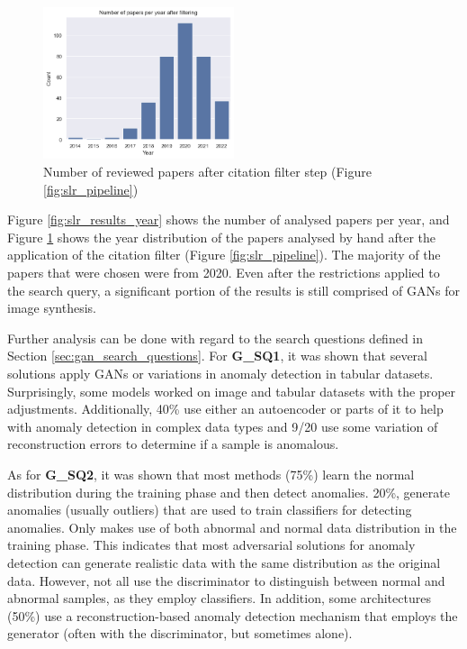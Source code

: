 \begin{figure}[]
\centering
\includegraphics[width=0.5\textwidth]{figures/slr_results_filtering.png}
\caption{Number of reviewed papers after citation filter step (Figure \ref{fig:slr_pipeline})}
\label{fig:slr_after_filter}
\end{figure}

Figure \ref{fig:slr_results_year} shows the number of analysed papers per year, and Figure \ref{fig:slr_after_filter} shows the year distribution of the papers analysed by hand after the application of the citation filter (Figure \ref{fig:slr_pipeline}). The majority of the papers that were chosen were from 2020. Even after the restrictions applied to the search query, a significant portion of the results is still comprised of GANs for image synthesis.

Further analysis can be done with regard to the search questions defined in Section \ref{sec:gan_search_questions}. For \textbf{G\_SQ1}, it was shown that several solutions apply GANs or variations in anomaly detection in tabular datasets. Surprisingly, some models worked on image and tabular datasets with the proper adjustments. Additionally, 40\% use either an autoencoder or parts of it to help with anomaly detection in complex data types and 9/20 use some variation of reconstruction errors to determine if a sample is anomalous.

As for \textbf{G\_SQ2}, it was shown that most methods (75\%) learn the normal distribution during the training phase and then detect anomalies. 20\%, generate anomalies (usually outliers) that are used to train classifiers for detecting anomalies. Only \cite{wang.etal_AnomalyDetectionMinimum_2018} makes use of both abnormal and normal data distribution in the training phase. This indicates that most adversarial solutions for anomaly detection can generate realistic data with the same distribution as the original data. However, not all use the discriminator to distinguish between normal and abnormal samples, as they employ classifiers. In addition, some architectures (50\%) use a reconstruction-based anomaly detection mechanism that employs the generator (often with the discriminator, but sometimes alone).

